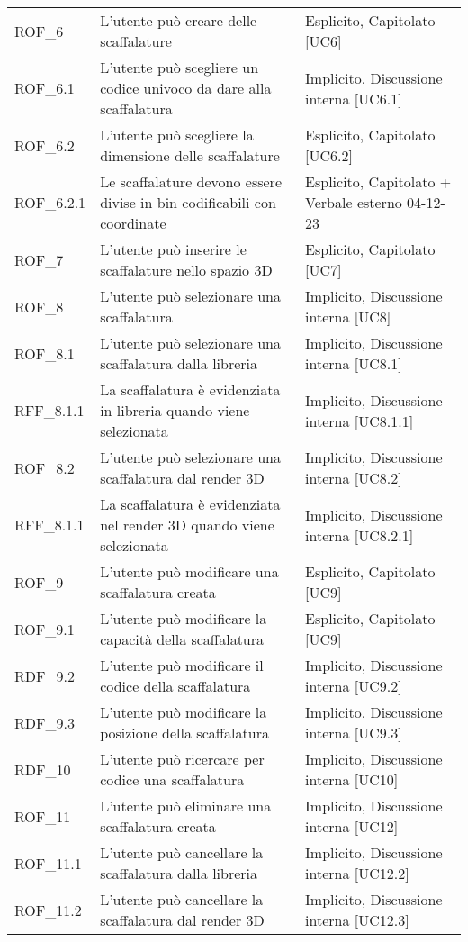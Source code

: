 \begin{xltabular}{\textwidth}{ p{0.1\textwidth} | X | p{0.3\textwidth} }
    ROF\_6 & L'utente può creare delle scaffalature & Esplicito, Capitolato [UC6]\\
    ROF\_6.1 & L'utente può scegliere un codice univoco da dare alla scaffalatura & Implicito, Discussione interna [UC6.1]\\
    ROF\_6.2 & L'utente può scegliere la dimensione delle scaffalature & Esplicito, Capitolato [UC6.2]\\
    ROF\_6.2.1 & Le scaffalature devono essere divise in bin codificabili con coordinate & Esplicito, Capitolato + Verbale esterno 04-12-23\\
    ROF\_7 & L'utente può inserire le scaffalature nello spazio 3D & Esplicito, Capitolato [UC7]\\
    ROF\_8 & L'utente può selezionare una scaffalatura & Implicito, Discussione interna [UC8]\\
    ROF\_8.1 & L'utente può selezionare una scaffalatura dalla libreria & Implicito, Discussione interna [UC8.1]\\
    RFF\_8.1.1 & La scaffalatura è evidenziata in libreria quando viene selezionata & Implicito, Discussione interna [UC8.1.1]\\
    ROF\_8.2 & L'utente può selezionare una scaffalatura dal render 3D & Implicito, Discussione interna [UC8.2]\\
    RFF\_8.1.1 & La scaffalatura è evidenziata nel render 3D quando viene selezionata & Implicito, Discussione interna [UC8.2.1]\\
    ROF\_9 & L'utente può modificare una scaffalatura creata & Esplicito, Capitolato [UC9]\\
    ROF\_9.1 & L'utente può modificare la capacità della scaffalatura & Esplicito, Capitolato [UC9]\\
    RDF\_9.2 & L'utente può modificare il codice della scaffalatura & Implicito, Discussione interna [UC9.2]\\
    RDF\_9.3 & L'utente può modificare la posizione della scaffalatura & Implicito, Discussione interna [UC9.3]\\
    RDF\_10 & L'utente può ricercare per codice una scaffalatura & Implicito, Discussione interna [UC10]\\
    ROF\_11 & L'utente può eliminare una scaffalatura creata & Implicito, Discussione interna [UC12]\\
    ROF\_11.1 & L'utente può cancellare la scaffalatura dalla libreria & Implicito, Discussione interna [UC12.2]\\
    ROF\_11.2 & L'utente può cancellare la scaffalatura dal render 3D & Implicito, Discussione interna [UC12.3]\\

\end{xltabular}
